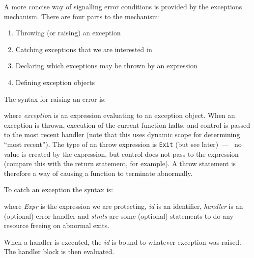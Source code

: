 A more concise way of signalling error conditions is provided by the
exceptions mechanism.  There are four parts to the mechanism:
\begin{enumerate}
\item Throwing (or raising) an exception
\item Catching exceptions that we are interested in
\item Declaring which exceptions may be thrown by an expression
\item Defining exception objects
\end{enumerate}

The syntax for raising an error is:


where {\em exception} is an expression evaluating to an exception object.
When an exception is thrown, execution of the current function halts,
and control is passed to the most recent handler (note that this uses
dynamic scope for determining ``most recent'').  The type of an throw
expression is {\tt Exit} (but see later)~--- \ie{}~no value is created by
the expression, but control does not pass to the expression (compare this
with the return statement, for example).  A throw statement is
therefore a way of causing a function to terminate abnormally.


To catch an exception the syntax is:



where {\em Expr} is the expression we are protecting, {\em id} is an
identifier, {\em handler} is an (optional) error handler and {\em
stmts} are some (optional) statements to do any resource freeing on
abnormal exits.

When a handler is executed, the {\em id} is bound to whatever exception
was raised.  The handler block is then evaluated.

